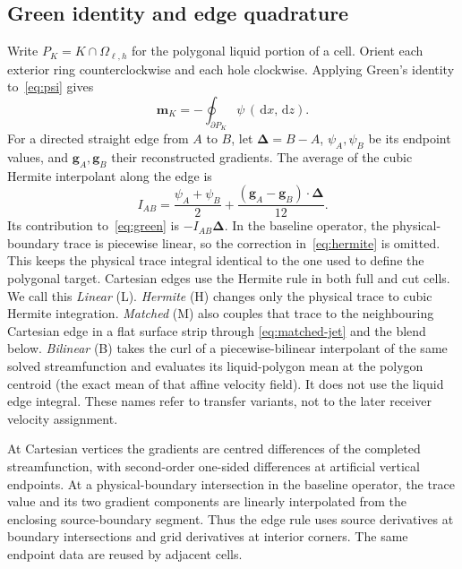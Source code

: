 \documentclass[10pt]{article}
\newcommand{\dd}{\,\mathrm{d}}
\begin{document}
\subsection{Green identity and edge quadrature}
Write $P_K=K\cap\Omega_{\ell,h}$ for the polygonal liquid portion of a cell.
Orient each exterior ring counterclockwise and each hole clockwise. Applying
Green's identity to~\eqref{eq:psi} gives
\begin{equation}
 \boldsymbol m_K=-\oint_{\partial P_K}\psi\,(\dd x,\dd z).
 \label{eq:green}
\end{equation}
For a directed straight edge from $A$ to $B$, let
$\boldsymbol\Delta=B-A$, $\psi_A,\psi_B$ be its endpoint values, and
$\boldsymbol g_A,\boldsymbol g_B$ their reconstructed gradients. The average
of the cubic Hermite interpolant along the edge is
\begin{equation}
 I_{AB}=\frac{\psi_A+\psi_B}{2}
       +\frac{(\boldsymbol g_A-\boldsymbol g_B)\cdot\boldsymbol\Delta}{12}.
 \label{eq:hermite}
\end{equation}
Its contribution to~\eqref{eq:green} is $-I_{AB}\boldsymbol\Delta$.
In the baseline operator, the physical-boundary trace is piecewise linear, so
the correction in~\eqref{eq:hermite} is omitted. This keeps the physical
trace integral identical to the one used to define the polygonal target.
Cartesian edges use the Hermite rule in both full and cut cells.
We call this \emph{Linear} (L). \emph{Hermite} (H) changes only the physical
trace to cubic Hermite integration. \emph{Matched} (M) also couples that
trace to the neighbouring Cartesian edge in a flat surface strip through
\eqref{eq:matched-jet} and the blend below. \emph{Bilinear} (B) takes the
curl of a piecewise-bilinear interpolant of the same solved streamfunction
and evaluates its liquid-polygon mean at the polygon centroid (the exact
mean of that affine velocity field). It does not use the liquid edge
integral. These names refer to transfer
variants, not to the later receiver velocity assignment.

At Cartesian vertices the gradients are centred differences of the completed
streamfunction, with second-order one-sided differences at artificial
vertical endpoints. At a physical-boundary intersection in the baseline operator, the trace value
and its two gradient components are linearly interpolated from the enclosing
source-boundary segment. Thus the edge rule uses source derivatives at
boundary intersections and grid derivatives at interior corners. The same
endpoint data are reused by adjacent cells.
\end{document}
